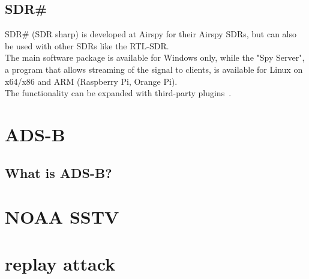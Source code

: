 \documentclass[conference]{IEEEtran}
\begin{document}
\subsection{SDR\#}
SDR\# (SDR sharp) is developed at Airspy for their Airspy SDRs, but can also be used with other SDRs like the RTL-SDR.\\The main software package is available for Windows only, while the "Spy Server", a program that allows streaming of the signal to clients, is available for Linux on x64/x86 and ARM (Raspberry Pi, Orange Pi).\\
The functionality can be expanded with third-party plugins~\cite{SDRsharp19Download}.

\section{ADS-B}
\subsection{What is ADS-B?}


\section{NOAA SSTV} %

\section{replay attack} %
\label{replayattack}




\end{document}
